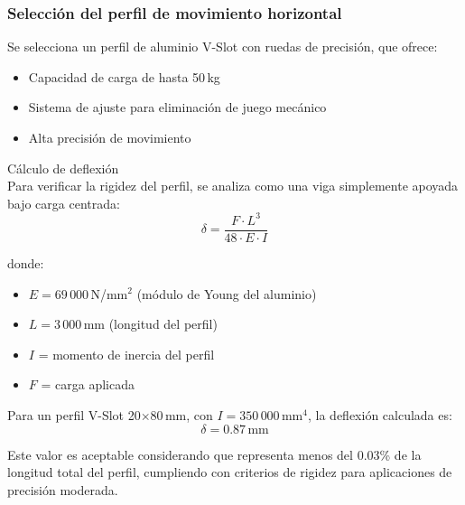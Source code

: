 \subsubsection{Selección del perfil de movimiento horizontal}
Se selecciona un perfil de aluminio V-Slot con ruedas de precisión, que ofrece:
\begin{itemize}[label=$\bullet$]
    \item Capacidad de carga de hasta 50\,kg
    \item Sistema de ajuste para eliminación de juego mecánico
    \item Alta precisión de movimiento
\end{itemize}

Cálculo de deflexión \\
\noindent
Para verificar la rigidez del perfil, se analiza como una viga simplemente apoyada bajo carga centrada:
\begin{equation}
\delta = \frac{F \cdot L^3}{48 \cdot E \cdot I}
\label{eq:deflexion_perfil}
\end{equation}

donde:
\begin{itemize}[label=$\bullet$]
    \item $E = 69\,000$\,N/mm$^2$ (módulo de Young del aluminio)
    \item $L = 3\,000$\,mm (longitud del perfil)
    \item $I$ = momento de inercia del perfil
    \item $F$ = carga aplicada
\end{itemize}

Para un perfil V-Slot 20$\times$80\,mm, con $I = 350\,000$\,mm$^4$, la deflexión calculada es:
\[\delta = 0.87\,\text{mm}\]

Este valor es aceptable considerando que representa menos del 0.03\% de la longitud total del perfil, cumpliendo con criterios de rigidez para aplicaciones de precisión moderada.

